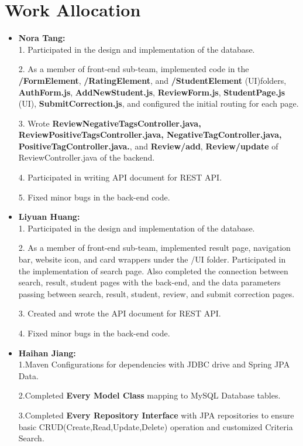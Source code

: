 \documentclass[12pt]{article}
\begin{document}
\section{Work Allocation}
\begin{itemize}
    \item \textbf{Nora Tang: } 
    \\1. Participated in the design and implementation of the database.
    
    2. As a member of front-end sub-team, implemented code in the \textbf{/FormElement}, 
    \textbf{/RatingElement}, and \textbf{/StudentElement} (UI)folders, 
    \textbf{AuthForm.js}, \textbf{AddNewStudent.js}, \textbf{ReviewForm.js}, 
    \textbf{StudentPage.js} (UI), \textbf{SubmitCorrection.js}, and configured the initial routing for each page. 
    
    3. Wrote \textbf{ReviewNegativeTagsController.java, ReviewPositiveTagsController.java, NegativeTagController.java, PositiveTagController.java.}, 
    and \textbf{Review/add}, \textbf{Review/update} of ReviewController.java of the backend. 
    
    4. Participated in writing API document for REST API.
    
    5. Fixed minor bugs in the back-end code.
    
    \item \textbf{Liyuan Huang: }
    \\ 1. Participated in the design and implementation of the database.
    
    2. As a member of front-end sub-team, implemented result page, navigation bar, website icon, and card wrappers under the /UI folder. Participated in the implementation of search page. Also completed the connection between search, result, student pages with the back-end, and the data parameters passing between search, result, student, review, and submit correction pages. 
    
    3. Created and wrote the API document for REST API.
    
    4. Fixed minor bugs in the back-end code.
    
    \item \textbf{Haihan Jiang: }
    \\1.Maven Configurations for dependencies with JDBC drive and Spring JPA Data.

	2.Completed \textbf{Every Model Class} mapping to MySQL Database tables.

	3.Completed \textbf{Every Repository Interface} with JPA repositories to ensure basic CRUD(Create,Read,Update,Delete) operation and customized Criteria Search.


\end{itemize}
\end{document}
